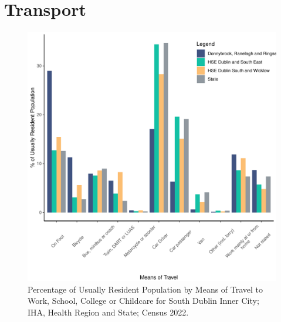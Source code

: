 \documentclass{article}
\begin{document}
\section{Transport}\label{sect:Trans}
\begin{figure}[H]
	\centering
	\includegraphics[width = 120mm]{../figures/TravelED.pdf}
	\caption{Percentage of Usually Resident Population by Means of Travel to Work, School, College or Childcare for South Dublin Inner City; IHA, Health Region and State; Census 2022.}
	\label{fig:vbnv}
	\end{figure}
\end{document}
